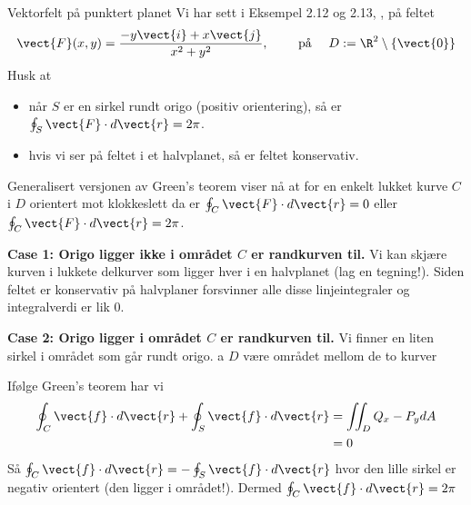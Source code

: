 \begin{eks}{Vektorfelt på punktert planet}
Vi har sett i Eksempel 2.12 og 2.13, , på feltet 
\[\vect{F}(x,y) = \frac{-y\vect{i}+x\vect{j}}{x^2+y^2}, \qquad \text{ på }\quad  D:= \R^2 \setminus \{\vect{0}\}\]
Husk at
\begin{itemize}
\item når $S$ er en sirkel rundt origo (positiv orientering), så er $\oint_S \vect{F}\cdot d\vect{r}=2\pi$. 
\item hvis vi ser på feltet i et halvplanet, så er feltet konservativ.
\end{itemize}
Generalisert versjonen av Green's teorem viser nå at for en enkelt lukket kurve $C$ i $D$ orientert mot klokkeslett da er $\oint_C \vect{F}\cdot d\vect{r} = 0$ eller $\oint_C \vect{F}\cdot d\vect{r} = 2\pi$.
\smallskip

\textbf{Case 1: Origo ligger ikke i området $C$ er randkurven til.} Vi kan skjære kurven i lukkete delkurver som ligger hver i en halvplanet (lag en tegning!). Siden feltet er konservativ på halvplaner forsvinner alle disse linjeintegraler og integralverdi er lik $0$.\smallskip

\textbf{Case 2: Origo ligger i området $C$ er randkurven til.}
Vi finner en liten sirkel i området som går rundt origo. a $D$ være området mellom de to kurver

\begin{minipage}{6cm}
Ifølge Green's teorem har vi \begin{align*}
\oint_C \vect{f}\cdot d\vect{r} + \oint_{S} \vect{f}\cdot d\vect{r}&=\iint_D Q_x - P_y dA  \\
&=0
\end{align*}
Så $\oint_C \vect{f}\cdot d\vect{r} =- \oint_{S} \vect{f}\cdot d\vect{r}$ hvor den lille sirkel er negativ orientert (den ligger i området!). Dermed $\oint_C \vect{f}\cdot d\vect{r} =2\pi$
\end{minipage}
\begin{minipage}{5cm}
\end{minipage}
\end{eks}

